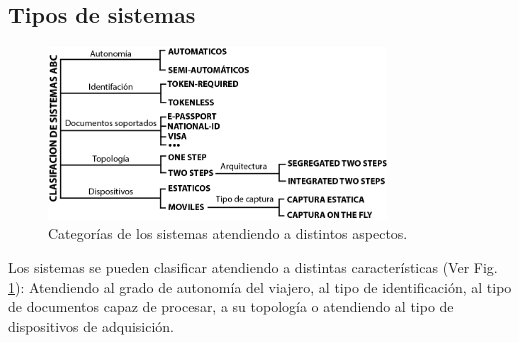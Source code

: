 \subsection{Tipos de sistemas}\label{sec:tiposABC}

\begin{figure}
 \centering
     \includegraphics[width=0.8\textwidth]{ch-sistemasABC/images/ch-SistemasABC/CATERGORIAS_DE_ABCS.png}     \caption{Categorías de los sistemas  atendiendo a distintos aspectos.}
    \label{fig:categoriasABC}
\end{figure}


Los sistemas  se pueden clasificar atendiendo a distintas características (Ver Fig. \ref{fig:categoriasABC}): Atendiendo al grado de autonomía del viajero, al tipo de identificación, al tipo de documentos capaz de procesar, a su topología o atendiendo al tipo de dispositivos de adquisición.

